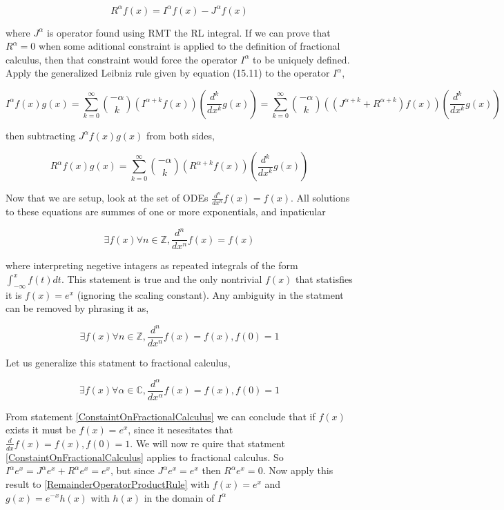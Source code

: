 \documentclass[%
 preprint,
 amsmath, amssymb, aps, pra, 10pt
]{revtex4-2}
\begin{document}
\[R^\alpha f(x) = I^\alpha f(x) - J^\alpha f(x)\]

where $J^\alpha$ is operator found using RMT the RL integral. If we can prove that $R^\alpha = 0$ when some aditional constraint is applied to the definition of fractional calculus, then that constraint would force the operator $I^\alpha$ to be uniquely defined. Apply the generalized Leibniz rule given by \cite{Leibniz} equation (15.11) to the operator $I^\alpha$,

\[I^\alpha f(x)g(x) = \sum_{k=0}^\infty \binom{-\alpha}{k}\left( I^{\alpha + k}f(x) \right)\left( \frac{d^k}{dx^k} g(x)\right) = \sum_{k=0}^\infty \binom{-\alpha}{k}\left( \left(J^{\alpha + k} + R^{\alpha + k}\right)f(x) \right)\left( \frac{d^k}{dx^k} g(x)\right)\]

then subtracting $J^\alpha f(x)g(x)$ from both sides, 

\begin{equation}
R^\alpha f(x)g(x) = \sum_{k=0}^\infty \binom{-\alpha}{k}\left( R^{\alpha + k}f(x) \right)\left( \frac{d^k}{dx^k} g(x)\right)
\label{RemainderOperatorProductRule}
\end{equation}

Now that we are setup, look at the set of ODEs $\frac{d^n}{dx^n}f(x) = f(x)$. All solutions to these equations are summes of one or more exponentials, and inpaticular

\[\exists f(x) \forall n \in \mathbb{Z}, \frac{d^n}{dx^n}f(x) = f(x)\]

where interpreting negetive intagers as repeated integrals of the form $\int_{-\infty}^x f(t)dt$. This statement is true and the only nontrivial $f(x)$ that statisfies it is $f(x) = e^x$ (ignoring the scaling constant). Any ambiguity in the statment can be removed by phrasing it as,

\begin{equation}
\exists f(x) \forall n \in \mathbb{Z}, \frac{d^n}{dx^n}f(x) = f(x), f(0) = 1
\label{ConstaintOnCalculus}
\end{equation}

Let us generalize this statment to fractional calculus,

\begin{equation}
\exists f(x) \forall \alpha \in \mathbb{C}, \frac{d^\alpha}{dx^\alpha}f(x) = f(x), f(0) = 1
\label{ConstaintOnFractionalCalculus}
\end{equation}

From statement \eqref{ConstaintOnFractionalCalculus} we can conclude that if $f(x)$ exists it must be $f(x) = e^x$, since it nesesitates that $\frac{d}{dx}f(x) = f(x), f(0) = 1$. We will now re	quire that statment \eqref{ConstaintOnFractionalCalculus} applies to fractional calculus. So $I^\alpha e^x = J^\alpha e^x + R^\alpha e^x = e^x$, but since $J^\alpha e^x = e^x$ then $R^\alpha e^x = 0$. Now apply this result to \eqref{RemainderOperatorProductRule} with $f(x) = e^x$ and $g(x) = e^{-x}h(x)$ with $h(x)$ in the domain of $I^\alpha$
\end{document}
